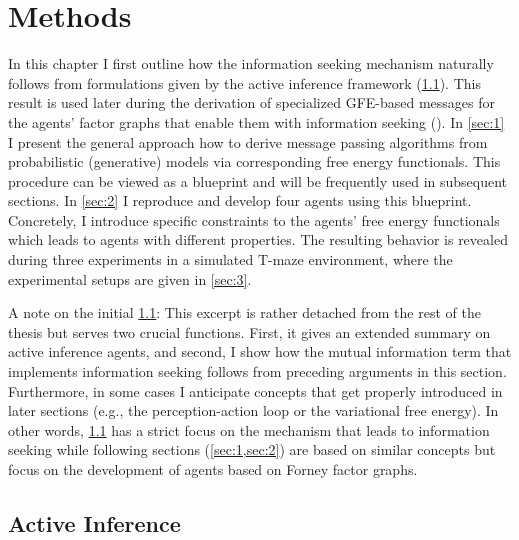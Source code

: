 \chapter{Methods}
\label{methods}

In this chapter I first outline how the information seeking mechanism naturally follows from formulations given by the active inference framework (\cref{sec:0}). This result is used later during the derivation of specialized GFE-based messages for the agents' factor graphs that enable them with information seeking (\cite{delaar2023,delaar2025}). In \cref{sec:1} I present the general approach how to derive message passing algorithms from probabilistic (generative) models via corresponding free energy functionals. This procedure can be viewed as a blueprint and will be frequently used in subsequent sections. In \cref{sec:2} I reproduce and develop four agents using this blueprint. Concretely, I introduce specific constraints to the agents' free energy functionals which leads to agents with different properties. The resulting behavior is revealed during three experiments in a simulated T-maze environment, where the experimental setups are given in \cref{sec:3}.

A note on the initial \cref{sec:0}: This excerpt is rather detached from the rest of the thesis but serves two crucial functions. First, it gives an extended summary on active inference agents, and second, I show how the mutual information term that implements information seeking follows from preceding arguments in this section. Furthermore, in some cases I anticipate concepts that get properly introduced in later sections (e.g., the perception-action loop or the variational free energy). In other words, \cref{sec:0} has a strict focus on the mechanism that leads to information seeking while following sections (\cref{sec:1,sec:2}) are based on similar concepts but focus on the development of agents based on Forney factor graphs.

\section{Active Inference}
\label{sec:0}

